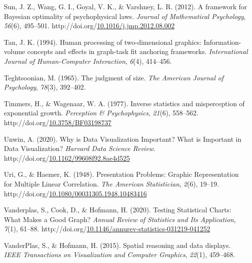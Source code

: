 \documentclass[print]{nuthesis}
\newlength{\cslhangindent}
\newenvironment{CSLReferences}%
{\setlength{\parindent}{0pt}%
\everypar{\setlength{\hangindent}{\cslhangindent}}\ignorespaces}%
{\par}
\begin{document}
\begin{CSLReferences}{1}{0}
\leavevmode\hypertarget{ref-sun_framework_2012}{}%
Sun, J. Z., Wang, G. I., Goyal, V. K., \& Varshney, L. R. (2012). A framework for {Bayesian} optimality of psychophysical laws. \emph{Journal of Mathematical Psychology}, \emph{56}(6), 495--501. http://doi.org/\href{https://doi.org/10.1016/j.jmp.2012.08.002}{10.1016/j.jmp.2012.08.002}

\leavevmode\hypertarget{ref-tan1994human}{}%
Tan, J. K. (1994). Human processing of two-dimensional graphics: Information-volume concepts and effects in graph-task fit anchoring frameworks. \emph{International Journal of Human-Computer Interaction}, \emph{6}(4), 414--456.

\leavevmode\hypertarget{ref-teghtsoonian1965judgment}{}%
Teghtsoonian, M. (1965). The judgment of size. \emph{The American Journal of Psychology}, \emph{78}(3), 392--402.

\leavevmode\hypertarget{ref-timmers_inverse_1977}{}%
Timmers, H., \& Wagenaar, W. A. (1977). Inverse statistics and misperception of exponential growth. \emph{Perception \& Psychophysics}, \emph{21}(6), 558--562. http://doi.org/\href{https://doi.org/10.3758/BF03198737}{10.3758/BF03198737}

\leavevmode\hypertarget{ref-unwin_why_2020}{}%
Unwin, A. (2020). Why is {Data} {Visualization} {Important}? {What} is {Important} in {Data} {Visualization}? \emph{Harvard Data Science Review}. http://doi.org/\href{https://doi.org/10.1162/99608f92.8ae4d525}{10.1162/99608f92.8ae4d525}

\leavevmode\hypertarget{ref-uri_presentation_1948}{}%
Uri, G., \& Haemer, K. (1948). Presentation {Problems}: {Graphic} {Representation} for {Multiple} {Linear} {Correlation}. \emph{The American Statistician}, \emph{2}(6), 19--19. http://doi.org/\href{https://doi.org/10.1080/00031305.1948.10483416}{10.1080/00031305.1948.10483416}

\leavevmode\hypertarget{ref-vanderplas_testing_2020}{}%
Vanderplas, S., Cook, D., \& Hofmann, H. (2020). Testing {Statistical} {Charts}: {What} {Makes} a {Good} {Graph}? \emph{Annual Review of Statistics and Its Application}, \emph{7}(1), 61--88. http://doi.org/\href{https://doi.org/10.1146/annurev-statistics-031219-041252}{10.1146/annurev-statistics-031219-041252}

\leavevmode\hypertarget{ref-vanderplas2015spatial}{}%
VanderPlas, S., \& Hofmann, H. (2015). Spatial reasoning and data displays. \emph{IEEE Transactions on Visualization and Computer Graphics}, \emph{22}(1), 459--468.


\end{CSLReferences}
\end{document}
